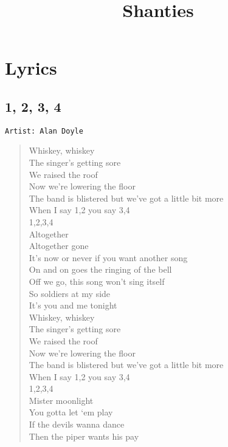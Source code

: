 \documentclass[11pt]{article}
\date{}
\title{Shanties}
\begin{document}
\maketitle
\tableofcontents

\clearpage
\section{Lyrics}
\label{sec:orgbcac076}
\subsection{1, 2, 3, 4}
\label{sec:org56543c7}
\begin{verbatim}
Artist: Alan Doyle
\end{verbatim}
\begin{verse}
Whiskey, whiskey\\
The singer’s getting sore\\
We raised the roof\\
Now we’re lowering the floor\\
The band is blistered but we’ve got a little bit more\\
When I say 1,2 you say 3,4\\
1,2,3,4\\
\vspace*{1em}
Altogether\\
Altogether gone\\
It’s now or never if you want another song\\
On and on goes the ringing of the bell\\
Off we go, this song won’t sing itself\\
So soldiers at my side\\
It’s you and me tonight\\
Whiskey, whiskey\\
The singer’s getting sore\\
We raised the roof\\
Now we’re lowering the floor\\
The band is blistered but we’ve got a little bit more\\
When I say 1,2 you say 3,4\\
1,2,3,4\\
\vspace*{1em}
Mister moonlight\\
You gotta let ‘em play\\
If the devils wanna dance\\
Then the piper wants his pay\\

\end{verse}
\end{document}
